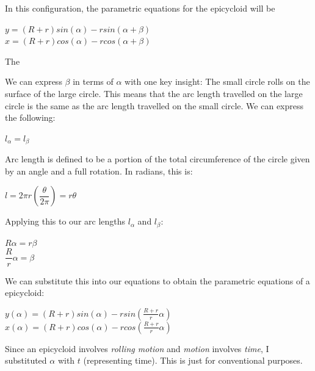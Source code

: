 In this configuration, the parametric equations for the epicycloid will be
\begin{centering}

$y = (R+r)sin(\alpha) - rsin(\alpha+\beta)$ \\ 
$x = (R+r)cos(\alpha) - rcos(\alpha+\beta)$ \\ 

\end{centering}
The 




We can express $\beta$ in terms of $\alpha$ with one key insight: The small circle rolls on the surface of the large circle. This means that the arc length travelled on the large circle is the same as the arc length travelled on the small circle. We can express the following:

\begin{centering}
$l_\alpha = l_\beta$ \\
\end{centering}

Arc length is defined to be a portion of the total circumference of the circle given by an angle and a full rotation. In radians, this is: \\

\begin{centering}
$l = 2\pi r(\dfrac{\theta}{2\pi}) = r\theta $ \\
\end{centering} 

Applying this to our arc lengths $l_\alpha$ and $l_\beta$: \\
\begin{centering}
$ R\alpha = r\beta$ \\
$\dfrac{R}{r}\alpha = \beta$ \\
\end{centering} 


We can substitute this into our equations to obtain the parametric equations of a epicycloid:

\begin{centering}
$y(\alpha) = (R+r)sin(\alpha) - rsin(\frac{R+r}{r}\alpha)$ \\ 
$x(\alpha) = (R+r)cos(\alpha) - rcos(\frac{R+r}{r}\alpha)$ \\ 
\end{centering}

Since an epicycloid involves \textit{rolling motion} and \textit{motion} involves \textit{time}, I substituted $\alpha$ with $t$ (representing time). This is just for conventional purposes.

